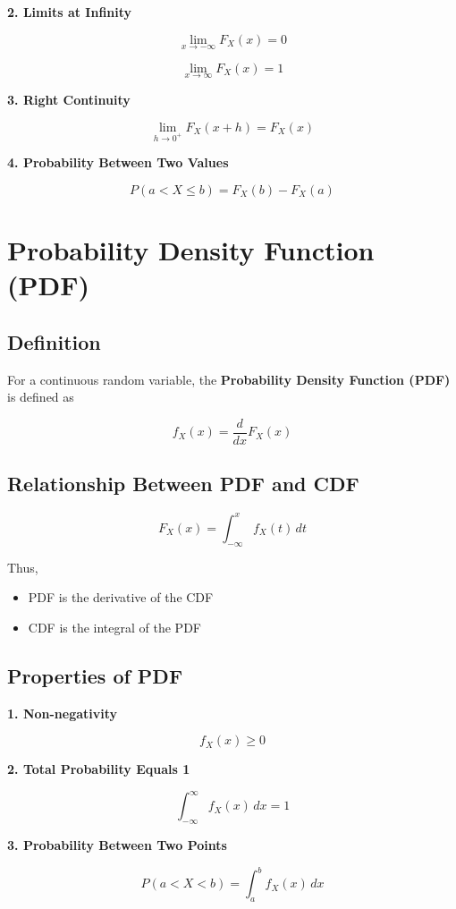 \documentclass[12pt]{article}
\begin{document}
\textbf{2. Limits at Infinity}

\[
\lim_{x \to -\infty} F_X(x) = 0
\]

\[
\lim_{x \to \infty} F_X(x) = 1
\]

\textbf{3. Right Continuity}

\[
\lim_{h \to 0^+} F_X(x+h) = F_X(x)
\]

\textbf{4. Probability Between Two Values}

\[
P(a < X \leq b) = F_X(b) - F_X(a)
\]

\section{Probability Density Function (PDF)}

\subsection{Definition}

For a continuous random variable, the \textbf{Probability Density Function (PDF)} is defined as

\[
f_X(x) = \frac{d}{dx}F_X(x)
\]

\subsection{Relationship Between PDF and CDF}

\[
F_X(x) = \int_{-\infty}^{x} f_X(t)\,dt
\]

Thus,

\begin{itemize}
\item PDF is the derivative of the CDF
\item CDF is the integral of the PDF
\end{itemize}

\subsection{Properties of PDF}

\textbf{1. Non-negativity}

\[
f_X(x) \ge 0
\]

\textbf{2. Total Probability Equals 1}

\[
\int_{-\infty}^{\infty} f_X(x)\,dx = 1
\]

\textbf{3. Probability Between Two Points}

\[
P(a < X < b) = \int_a^b f_X(x)\,dx
\]
\end{document}
